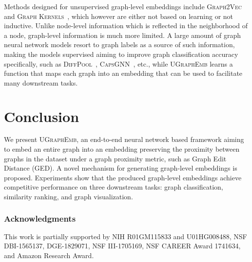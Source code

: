 \documentclass{article}
\newcommand{\model}{\textsc{UGraphEmb}\xspace}
\newcommand{\gk}{\textsc{Graph Kernels}\xspace}
\newcommand{\gv}{\textsc{Graph2Vec}\xspace}
\begin{document}
Methods designed for unsupervised graph-level embeddings include \gv~\cite{narayanan2017graph2vec}
and \gk~\cite{yanardag2015deep}, which however are either not based on learning or not inductive. 
Unlike node-level information which is reflected in the neighborhood of a node,
graph-level information is much more limited. A large amount of graph neural network models resort to graph labels as a source of such information, 
making the models supervised aiming to improve graph classification accuracy specifically, such as \textsc{DiffPool}~\cite{ying2018hierarchical}, \textsc{CapsGNN}~\cite{zhang2018capsule}, etc.,
while \model learns a function that maps each graph into an embedding that can be used to facilitate many downstream tasks.






















 






 \section{Conclusion}

We present \model, an end-to-end neural network based framework aiming to embed an entire graph into an embedding preserving the proximity between graphs in the dataset under a graph proximity metric, such as Graph Edit Distance (GED). A novel mechanism for generating graph-level embeddings is proposed. Experiments show that the produced graph-level embeddings achieve competitive performance on three downstream tasks: graph classification, similarity ranking, and graph visualization. 



\label{sec-conc} 
\subsubsection*{Acknowledgments}

This work is partially supported by NIH R01GM115833 and U01HG008488, NSF DBI-1565137, DGE-1829071, NSF III-1705169, NSF CAREER Award 1741634, and Amazon Research Award.
\end{document}
